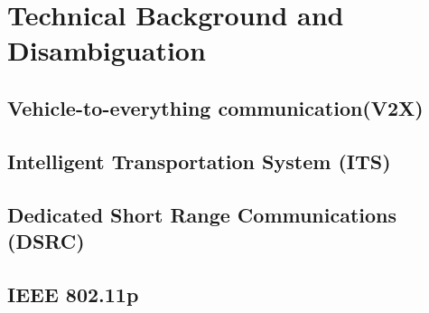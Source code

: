 \chapter{Technical Background and Disambiguation}
\label{cha:Implementation}

\section{Vehicle-to-everything communication(V2X)}

\section{Intelligent Transportation System (ITS)}

\section{Dedicated Short Range Communications (DSRC)}

\section{IEEE 802.11p}
